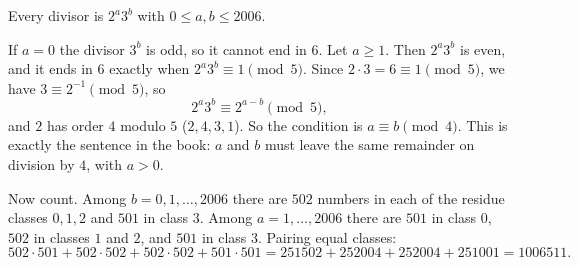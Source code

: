 Every divisor is $2^a3^b$ with $0\le a,b\le2006$.

If $a=0$ the divisor $3^b$ is odd, so it cannot end in $6$. Let $a\ge1$. Then $2^a3^b$ is even, and it ends in $6$ exactly when $2^a3^b\equiv1\pmod5$. Since $2\cdot3=6\equiv1\pmod5$, we have $3\equiv2^{-1}\pmod5$, so
\[
2^a3^b\equiv2^{a-b}\pmod5,
\]
and $2$ has order $4$ modulo $5$ ($2,4,3,1$). So the condition is $a\equiv b\pmod4$. This is exactly the sentence in the book: $a$ and $b$ must leave the same remainder on division by $4$, with $a>0$.

Now count. Among $b=0,1,\dots,2006$ there are $502$ numbers in each of the residue classes $0,1,2$ and $501$ in class $3$. Among $a=1,\dots,2006$ there are $501$ in class $0$, $502$ in classes $1$ and $2$, and $501$ in class $3$. Pairing equal classes:
\[
502\cdot501+502\cdot502+502\cdot502+501\cdot501=251502+252004+252004+251001=\boxed{1006511}.
\]
